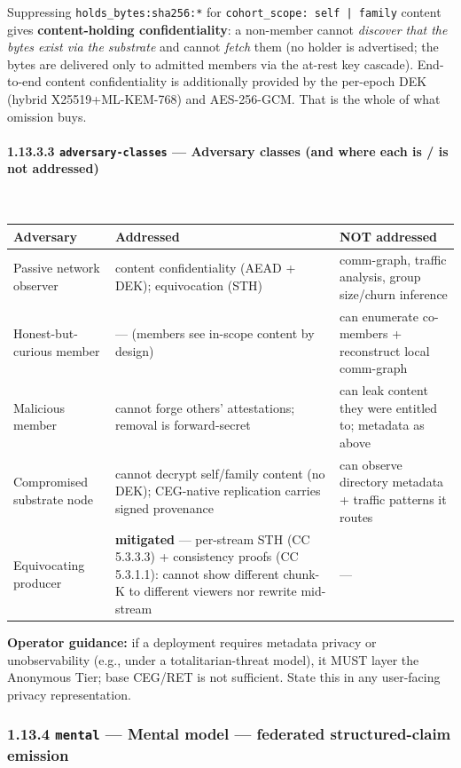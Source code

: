 \documentclass[11pt]{article}
\begin{document}
Suppressing \texttt{holds\_bytes:sha256:*} for \texttt{cohort\_scope: self | family} content gives \textbf{content-holding confidentiality}: a non-member cannot \textit{discover that the bytes exist via the substrate} and cannot \textit{fetch} them (no holder is advertised; the bytes are delivered only to admitted members via the at-rest key cascade). End-to-end content confidentiality is additionally provided by the per-epoch DEK (hybrid X25519+ML-KEM-768) and AES-256-GCM. That is the whole of what omission buys.


\paragraph{1.13.3.3 \texttt{adversary-classes} — Adversary classes (and where each is / is not addressed)}\mbox{}\\


{\footnotesize
\begin{longtable}{|p{5.33cm}|p{5.33cm}|p{5.33cm}|}\hline
\textbf{Adversary} & \textbf{Addressed} & \textbf{NOT addressed} \\ \hline\endhead
Passive network observer & content confidentiality (AEAD + DEK); equivocation (STH) & comm-graph, traffic analysis, group size/churn inference \\ \hline
Honest-but-curious member & — (members see in-scope content by design) & can enumerate co-members + reconstruct local comm-graph \\ \hline
Malicious member & cannot forge others' attestations; removal is forward-secret & can leak content they were entitled to; metadata as above \\ \hline
Compromised substrate node & cannot decrypt self/family content (no DEK); CEG-native replication carries signed provenance & can observe directory metadata + traffic patterns it routes \\ \hline
Equivocating producer & \textbf{mitigated} — per-stream STH (CC 5.3.3.3) + consistency proofs (CC 5.3.1.1): cannot show different chunk-K to different viewers nor rewrite mid-stream & — \\ \hline
\end{longtable}}


\textbf{Operator guidance:} if a deployment requires metadata privacy or unobservability (e.g., under a totalitarian-threat model), it MUST layer the Anonymous Tier; base CEG/RET is not sufficient. State this in any user-facing privacy representation.


\subsubsection*{1.13.4 \texttt{mental} — Mental model — federated structured-claim emission}
\end{document}
